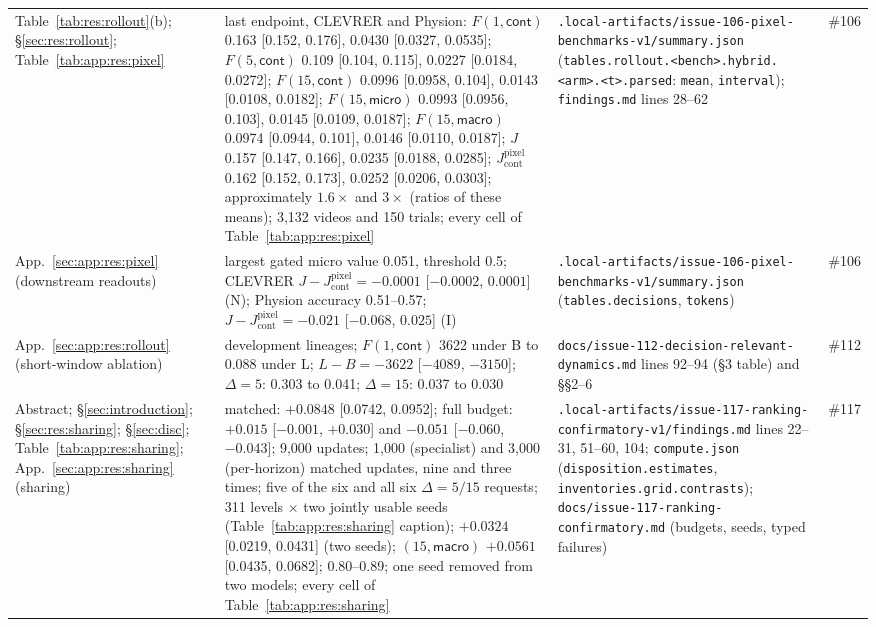 {\begin{revblock}
\begin{longtable}{@{}>{\raggedright\arraybackslash}p{}>{\raggedright\arraybackslash}p{}>{\raggedright\arraybackslash}p{}>{\raggedright\arraybackslash}p{}@{}}
Table~\ref{tab:res:rollout}(b); \S\ref{sec:res:rollout}; Table~\ref{tab:app:res:pixel} & last endpoint, CLEVRER and Physion: $F(1,\textsf{cont})$ 0.163 [0.152, 0.176], 0.0430 [0.0327, 0.0535]; $F(5,\textsf{cont})$ 0.109 [0.104, 0.115], 0.0227 [0.0184, 0.0272]; $F(15,\textsf{cont})$ 0.0996 [0.0958, 0.104], 0.0143 [0.0108, 0.0182]; $F(15,\textsf{micro})$ 0.0993 [0.0956, 0.103], 0.0145 [0.0109, 0.0187]; $F(15,\textsf{macro})$ 0.0974 [0.0944, 0.101], 0.0146 [0.0110, 0.0187]; $J$ 0.157 [0.147, 0.166], 0.0235 [0.0188, 0.0285]; $J_{\mathrm{cont}}^{\mathrm{pixel}}$ 0.162 [0.152, 0.173], 0.0252 [0.0206, 0.0303]; approximately $1.6\times$ and $3\times$ (ratios of these means); 3,132 videos and 150 trials; every cell of Table~\ref{tab:app:res:pixel} & \nolinkurl{.local-artifacts/issue-106-pixel-benchmarks-v1/summary.json} (\nolinkurl{tables.rollout.<bench>.hybrid.<arm>.<t>.parsed}: \texttt{mean}, \texttt{interval}); \nolinkurl{findings.md} lines 28--62 & \#106 \\
App.~\ref{sec:app:res:pixel} (downstream readouts) & largest gated micro value 0.051, threshold 0.5; CLEVRER $J-J_{\mathrm{cont}}^{\mathrm{pixel}}=-0.0001$ [$-0.0002$, $0.0001$] (N); Physion accuracy 0.51--0.57; $J-J_{\mathrm{cont}}^{\mathrm{pixel}}=-0.021$ [$-0.068$, $0.025$] (I) & \nolinkurl{.local-artifacts/issue-106-pixel-benchmarks-v1/summary.json} (\nolinkurl{tables.decisions}, \nolinkurl{tokens}) & \#106 \\
App.~\ref{sec:app:res:rollout} (short-window ablation) & 12 development lineages; $F(1,\textsf{cont})$ 3622 under B to 0.088 under L; $L-B=-3622$ [$-4089$, $-3150$]; $\Delta=5$: 0.303 to 0.041; $\Delta=15$: 0.037 to 0.030 & \nolinkurl{docs/issue-112-decision-relevant-dynamics.md} lines 92--94 (\S3 table) and \S\S2--6 & \#112 \\
Abstract; \S\ref{sec:introduction}; \S\ref{sec:res:sharing}; \S\ref{sec:disc}; Table~\ref{tab:app:res:sharing}; App.~\ref{sec:app:res:sharing} (sharing) & matched: $+0.0848$ [0.0742, 0.0952]; full budget: $+0.015$ [$-0.001$, $+0.030$] and $-0.051$ [$-0.060$, $-0.043$]; 9,000 updates; 1,000 (specialist) and 3,000 (per-horizon) matched updates, nine and three times; five of the six and all six $\Delta=5/15$ requests; 311 levels $\times$ two jointly usable seeds (Table~\ref{tab:app:res:sharing} caption); $+0.0324$ [0.0219, 0.0431] (two seeds); $(15,\textsf{macro})$ $+0.0561$ [0.0435, 0.0682]; 0.80--0.89; one seed removed from two models; every cell of Table~\ref{tab:app:res:sharing} & \nolinkurl{.local-artifacts/issue-117-ranking-confirmatory-v1/findings.md} lines 22--31, 51--60, 104; \nolinkurl{compute.json} (\nolinkurl{disposition.estimates}, \nolinkurl{inventories.grid.contrasts}); \nolinkurl{docs/issue-117-ranking-confirmatory.md} (budgets, seeds, typed failures) & \#117 \\

\end{longtable}
\end{revblock}}
